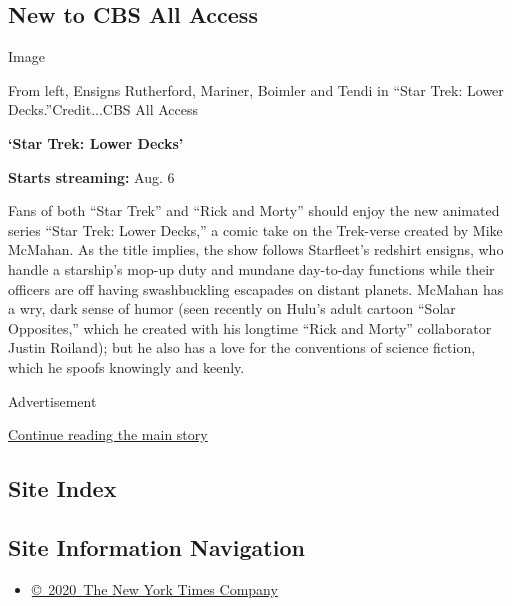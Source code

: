 \hypertarget{new-to-cbs-all-access}{%
\subsection{New to CBS All Access}\label{new-to-cbs-all-access}}

Image

From left, Ensigns Rutherford, Mariner, Boimler and Tendi in ``Star
Trek: Lower Decks.''Credit...CBS All Access

\textbf{`Star Trek: Lower Decks'}

\textbf{Starts streaming:} Aug. 6

Fans of both ``Star Trek'' and ``Rick and Morty'' should enjoy the new
animated series ``Star Trek: Lower Decks,'' a comic take on the
Trek-verse created by Mike McMahan. As the title implies, the show
follows Starfleet's redshirt ensigns, who handle a starship's mop-up
duty and mundane day-to-day functions while their officers are off
having swashbuckling escapades on distant planets. McMahan has a wry,
dark sense of humor (seen recently on Hulu's adult cartoon ``Solar
Opposites,'' which he created with his longtime ``Rick and Morty''
collaborator Justin Roiland); but he also has a love for the conventions
of science fiction, which he spoofs knowingly and keenly.

Advertisement

\protect\hyperlink{after-bottom}{Continue reading the main story}

\hypertarget{site-index}{%
\subsection{Site Index}\label{site-index}}

\hypertarget{site-information-navigation}{%
\subsection{Site Information
Navigation}\label{site-information-navigation}}

\begin{itemize}
\tightlist
\item
  \href{https://help.nytimes3xbfgragh.onion/hc/en-us/articles/115014792127-Copyright-notice}{©~2020~The
  New York Times Company}
\end{itemize}


